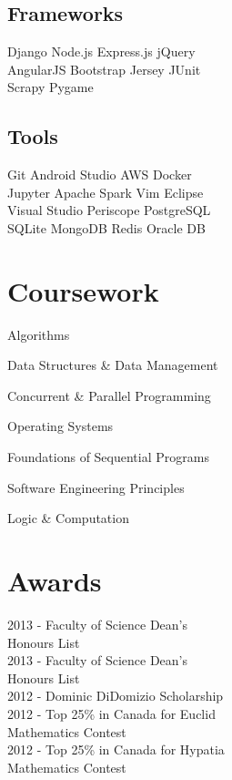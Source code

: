 \documentclass[letterpaper]{deedy-resume}
\begin{document}
\begin{minipage}[t]{0.33\textwidth}
\sectionspace %
\subsection{Frameworks}

Django \textbullet{} Node.js \textbullet{} Express.js \textbullet{} jQuery  \\
AngularJS \textbullet{} Bootstrap \textbullet{} Jersey \textbullet{} JUnit \\ 
Scrapy \textbullet{} Pygame

\sectionspace

\subsection{Tools}
Git \textbullet{} Android Studio \textbullet{} AWS \textbullet{} Docker\\
Jupyter \textbullet{} Apache Spark \textbullet{} Vim \textbullet{} Eclipse\\
Visual Studio \textbullet{} Periscope \textbullet{} PostgreSQL\\
SQLite \textbullet{} MongoDB \textbullet{} Redis \textbullet{} Oracle DB
\sectionspace

\section{Coursework}
\vspace{\topsep}
\begin{tightitemize}
\item Algorithms
\item Data Structures \& Data Management
\item Concurrent \& Parallel Programming
\item Operating Systems
\item Foundations of Sequential Programs
\item Software Engineering Principles
\item Logic \& Computation
\end{tightitemize}
\sectionspace

\section{Awards}
2013 - Faculty of Science Dean's\\
\hspace{1.05cm}Honours List\\
2013 - Faculty of Science Dean's\\
\hspace{1.05cm}Honours List\\
2012 - Dominic DiDomizio Scholarship\\
2012 - Top 25\% in Canada for Euclid\\
\hspace{1.05cm}Mathematics Contest\\
2012 - Top 25\% in Canada for Hypatia\\
\hspace{1.05cm}Mathematics Contest
\sectionspace

\end{minipage} %
\end{document}
